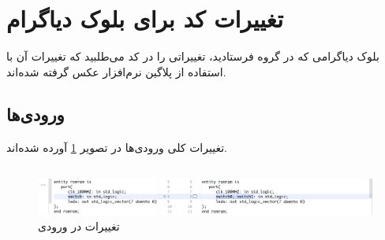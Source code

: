 \documentclass[dvipsnames, svgnames, x11names, a4paper, 11pt]{article}
\begin{document}
\section{تغییرات کد برای بلوک دیاگرام}
بلوک دیاگرامی که در گروه فرستادید، تغییراتی را در کد 
می‌طلبید که تغییرات آن با استفاده از پلاگین  نرم‌افزار 
عکس گرفته شده‌اند.

\subsection{ورودی‌ها}
تغییرات کلی ورودی‌‌‌ها در تصویر 
\ref{fig:input-changes}
آورده شده‌اند.

\subsection{}

\begin{figure}[b]
\begin{center}
\includegraphics[width=0.90\textheight, height=0.15\textwidth, angle=90]{./images/input-switiches}
\end{center}
\caption{تغییرات در ورودی}
\label{fig:input-changes}
\end{figure}

\listoffigures
\end{document}
